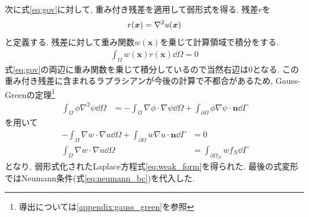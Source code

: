 \documentclass{ltjsarticle}
\begin{document}
次に式\eqref{eq:gov}に対して, 重み付き残差を適用して弱形式を得る.
残差$r$を
\begin{align}
    r(\bm{x}) = \laplacian u(\bm{x}) \label{eq:residual}
\end{align}
と定義する. 残差に対して重み関数$w(\bm{x})$を乗じて計算領域で積分をする.
\begin{align}
    \int_\Omega w(\bm{x})r(\bm{x})\dd{\Omega} = 0
\end{align}
式\eqref{eq:gov}の両辺に重み関数を乗じて積分しているので当然右辺は0となる.
この重み付き残差に含まれるラプラシアンが今後の計算で不都合があるため, 
Gauss-Greenの定理\footnote{導出については\ref{appendix:gauss_green}を参照}
\begin{align}
    \int_\Omega\phi\nabla^2\psi\dd{\Omega} 
    &=- \int_\Omega\nabla\phi\cdot\nabla\psi\dd{\Omega}
    +\int_{\partial\Omega}\phi\nabla\psi\cdot\bm{n}\dd{\Gamma}
    \label{eq:gauss_green}
\end{align}
を用いて
\begin{align}
    - \int_\Omega\nabla w\cdot\nabla u\dd{\Omega}
    +\int_{\partial\Omega}w\nabla u\cdot\bm{n}\dd{\Gamma} &= 0 \\
    \int_\Omega\nabla w\cdot\nabla u\dd{\Omega}
    &= \int_{\partial\Omega_N}w f_N\dd{\Gamma} \label{eq:weak_form}
\end{align}
となり, 弱形式化されたLaplace方程式\eqref{eq:weak_form}を得られた.
最後の式変形ではNeumann条件(式\eqref{eq:neumann_bc})を代入した.
\end{document}
